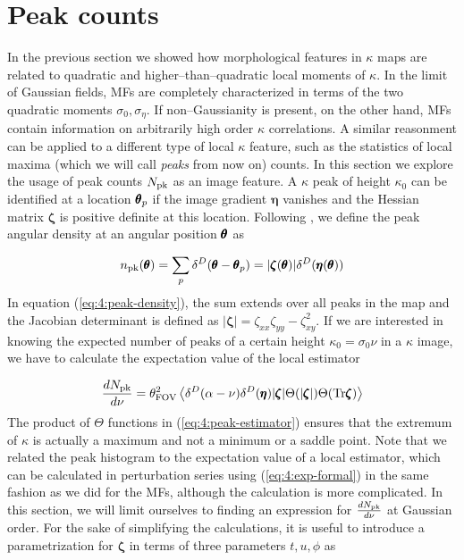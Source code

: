 \section{Peak counts}
In the previous section we showed how morphological features in $\kappa$ maps are related to quadratic and higher--than--quadratic local moments of $\kappa$. In the limit of Gaussian fields, MFs are completely characterized in terms of the two quadratic moments $\sigma_0,\sigma_\eta$. If non--Gaussianity is present, on the other hand, MFs contain information on arbitrarily high order $\kappa$ correlations. A similar reasonment can be applied to a different type of local $\kappa$ feature, such as the statistics of local maxima (which we will call \textit{peaks} from now on) counts. In this section we explore the usage of peak counts $N_{\rm pk}$ as an image feature. A $\kappa$ peak of height $\kappa_0$ can be identified at a location $\pmb{\theta}_p$ if the image gradient $\pmb{\eta}$ vanishes and the Hessian matrix $\pmb{\zeta}$ is positive definite at this location. Following \citep{BondCMB}, we define the peak angular density at an angular position $\pmb{\theta}$ as 

\begin{equation}
\label{eq:4:peak-density}
n_{\rm pk}(\pmb{\theta}) = \sum_p \delta^D(\pmb{\theta}-\pmb{\theta}_p) = \vert\pmb{\zeta}(\pmb{\theta})\vert\delta^D(\pmb{\eta}(\pmb{\theta}))
\end{equation}
%
In equation (\ref{eq:4:peak-density}), the sum extends over all peaks in the map and the Jacobian determinant is defined as $\vert\pmb{\zeta}\vert=\zeta_{xx}\zeta_{yy}-\zeta_{xy}^2$. If we are interested in knowing the expected number of peaks of a certain height $\kappa_0=\sigma_0\nu$ in a $\kappa$ image, we have to calculate the expectation value of the local estimator

\begin{equation}
\label{eq:4:peak-estimator}
\frac{dN_{\rm pk}}{d\nu} = \theta^2_{\rm FOV}\left\langle\delta^D(\alpha-\nu)\delta^D(\pmb{\eta})\vert\pmb{\zeta}\vert\Theta(\vert\pmb{\zeta}\vert)\Theta({\rm Tr}\pmb{\zeta})\right\rangle
\end{equation}
%
The product of $\Theta$ functions in (\ref{eq:4:peak-estimator}) ensures that the extremum of $\kappa$ is actually a maximum and not a minimum or a saddle point. Note that we related the peak histogram to the expectation value of a local estimator, which can be calculated in perturbation series using (\ref{eq:4:exp-formal}) in the same fashion as we did for the MFs, although the calculation is more complicated. In this section, we will limit ourselves to finding an expression for $\frac{dN_{\rm pk}}{d\nu}$ at Gaussian order. For the sake of simplifying the calculations, it is useful to introduce a parametrization for $\pmb{\zeta}$ in terms of three parameters $t,u,\phi$ as

